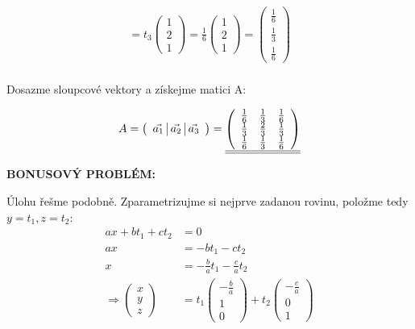\documentclass[12pt]{article}
\begin{document}
\begin{enumerate}
\begin{align*}
        = t_3 \left(\begin{array}{c} 1 \\ 2 \\ 1 \end{array}\right)
        = \frac{1}{6} \left(\begin{array}{c} 1 \\ 2 \\ 1 \end{array}\right)
        = \left(\begin{array}{c} \frac{1}{6} \\ \frac{1}{3} \\ \frac{1}{6} \end{array}\right) \\
    \end{align*}

    Dosazme sloupcové vektory a získejme matici A:

    \[
      A = \left(\begin{array}{c} \vec{a_1} \;\vline\; \vec{a_2} \;\vline\; \vec{a_3} \end{array}\right)
        = \underline{\underline{\left(\begin{array}{ccc}
            \frac{1}{6} & \frac{1}{3} & \frac{1}{6} \\
            \frac{1}{3} & \frac{2}{3} & \frac{1}{3} \\
            \frac{1}{6} & \frac{1}{3} & \frac{1}{6} \\
          \end{array}\right)}}
    \]

\end{enumerate}

\textbf{BONUSOVÝ PROBLÉM:}
  
Úlohu řešme podobně. Zparametrizujme si nejprve zadanou rovinu, položme tedy $y=t_1, z=t_2$:
    \begin{align*}
      ax + bt_1 + ct_2 &= 0 \\
      ax &= -bt_1 - ct_2 \\
      x &= -\frac{b}{a}t_1 - \frac{c}{a}t_2 \\
      \Longrightarrow \left(\begin{array}{c} x\\y\\z \end{array}\right)
        &= t_1 \left(\begin{array}{c} -\frac{b}{a}\\1\\0 \end{array}\right) + t_2 \left(\begin{array}{c} -\frac{c}{a}\\0\\1 \end{array}\right)
    \end{align*}
\end{document}
